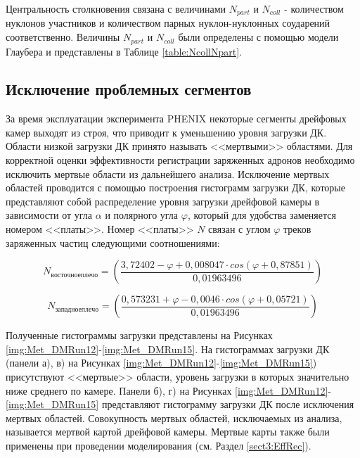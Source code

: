 Центральность столкновения связана с величинами $N_{part}$ и $N_{coll}$ - количеством нуклонов участников и количеством парных нуклон-нуклонных соударений соответственно. Величины $N_{part}$ и $N_{coll}$ были определены с помощью модели Глаубера и представлены в Таблице \ref{table:NcollNpart}.

\subsection{Исключение проблемных сегментов} \label{sect3_DM}
За время эксплуатации эксперимента PHENIX некоторые сегменты дрейфовых камер выходят из строя, что приводит к уменьшению уровня загрузки ДК. Области низкой загрузки ДК принято называть <<мертвыми>> областями. 
Для корректной оценки эффективности регистрации заряженных адронов необходимо исключить мертвые области из дальнейшего анализа. 
Исключение мертвых областей проводится с помощью построения гистограмм загрузки ДК, которые представляют собой распределение уровня загрузки дрейфовой камеры в зависимости от угла $\alpha$ и полярного угла $\varphi$, который для удобства заменяется номером <<платы>>. Номер <<платы>> $N$ связан с углом $\varphi$ треков заряженных частиц следующими соотношениями: 

\begin{equation}
	N_{восточное плечо} = \left( \frac{3,72402 - \varphi + 0,008047 \cdot cos(\varphi + 0,87851)}{0,01963496} \right)
\end{equation}


\begin{equation}
	N_{западное плечо} = \left( \frac{0,573231 + \varphi - 0,0046 \cdot cos(\varphi + 0,05721)}{0,01963496} \right)
\end{equation}

Полученные гистограммы загрузки представлены на Рисунках \ref{img:Met_DMRun12}-\ref{img:Met_DMRun15}. 
На гистограммах загрузки ДК (панели а), в) на Рисунках \ref{img:Met_DMRun12}-\ref{img:Met_DMRun15}) присутствуют <<мертвые>> области, уровень загрузки в которых значительно ниже среднего по камере. 
Панели б), г) на Рисунках \ref{img:Met_DMRun12}-\ref{img:Met_DMRun15} представляют гистограмму загрузки ДК после исключения мертвых областей. 
Совокупность мертвых областей, исключаемых из анализа, называется мертвой картой дрейфовой камеры. Мертвые карты также были применены при проведении моделирования (см. Раздел \ref{sect3:EffRec}).


